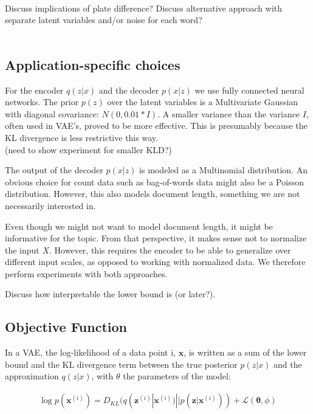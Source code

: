 \documentclass{report}
\begin{document}
\\ 
Discuss implications of plate difference? Discuss alternative approach with separate latent variables and/or noise for each word?\\ \\

\subsection{Application-specific choices}

For the encoder $q(z|x)$ and the decoder $p(x|z)$ we use fully connected neural networks. The prior $p(z)$ over the latent variables is a Multivariate Gaussian with diagonal covariance: $N(0,0.01*I)$. A smaller variance than the variance $I$, often used in VAE's, proved to be more effective. This is presumably because the KL divergence is less restrictive this way. 
\\
(need to show experiment for smaller KLD?)


The output of the decoder $p(x|z)$ is modeled as a Multinomial distribution. An obvious choice for count data such as bag-of-words data might also be a Poisson distribution. However, this also models document length, something we are not necessarily interested in.  

Even though we might not want to model document length, it might be informative for the topic. From that perspective, it makes sense not to normalize the input $X$. However, this requires the encoder to be able to generalize over different input scales, as opposed to working with normalized data. We therefore perform experiments with both approaches.

Discuss how interpretable the lower bound is (or later?). 

\subsection{Objective Function}

In a VAE, the log-likelihood of a data point i, $\mathbf{x}$, is written as a sum of the lower bound and the KL divergence term between the true posterior $p(z|x)$ and the approximation $q(z|x)$, with $\theta$ the parameters of the model:

\begin{align*}
\log p(\mathbf{x}^{(i)}) = D_{KL}(q(\mathbf{z}^{(i)}|\mathbf{x}^{(i)}) || p(\mathbf{z}|\mathbf{x}^{(i)})) + \mathcal{L}(\mathbf{\theta}, \phi)
\end{align*}
\end{document}
